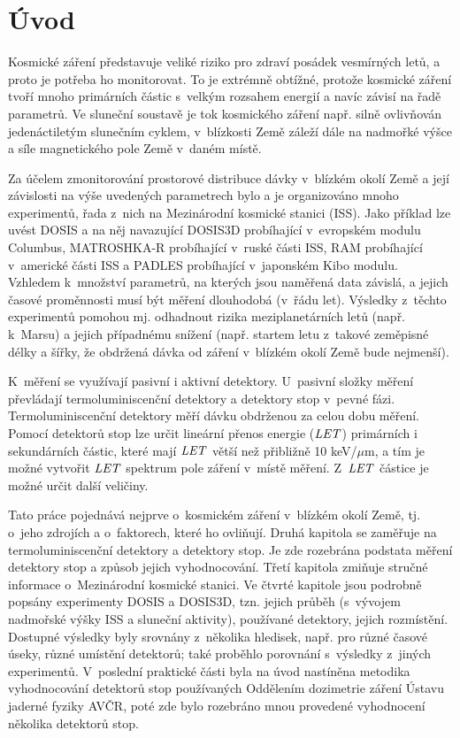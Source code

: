\chapter*{Úvod}
\markright{}
Kosmické záření představuje veliké riziko pro zdraví posádek vesmírných letů, a proto je potřeba ho monitorovat. To je extrémně obtížné, protože kosmické záření tvoří mnoho primárních částic s~velkým rozsahem energií a navíc závisí na řadě parametrů. Ve sluneční soustavě je tok kosmického záření např. silně ovlivňován jedenáctiletým slunečním cyklem, v~blízkosti Země záleží dále na nadmořké výšce a síle magnetického pole Země v~daném místě. 

Za účelem zmonitorování prostorové distribuce dávky v~blízkém okolí Země a její závislosti na výše uvedených parametrech bylo a je organizováno mnoho experimentů, řada z~nich na Mezinárodní kosmické stanici (ISS). Jako příklad lze uvést DOSIS a na něj navazující DOSIS3D probíhající v~evropském modulu Columbus, MATROSHKA-R probíhající v~ruské části ISS, RAM probíhající v~americké části ISS a PADLES probíhající v~japonském Kibo modulu. Vzhledem k~množství parametrů, na kterých jsou naměřená data závislá, a jejich časové proměnnosti musí být měření dlouhodobá (v~řádu let). Výsledky z~těchto experimentů pomohou mj. odhadnout rizika meziplanetárních letů (např. k~Marsu) a jejich případnému snížení (např. startem letu z~takové zeměpisné délky a šířky, že obdržená dávka od záření v~blízkém okolí Země bude nejmenší). 

K~měření se využívají pasivní i aktivní detektory. U~pasivní složky měření převládají termoluminiscenční detektory a detektory stop v~pevné fázi. Termoluminiscenční detektory měří dávku obdrženou za celou dobu měření. Pomocí detektorů stop lze určit lineární přenos energie ($\mathit{LET}$) primárních i sekundárních částic, které mají $\mathit{LET}$ větší než přibližně 10 keV/$\mu$m, a tím je možné vytvořit $\mathit{LET}$ spektrum pole záření v~místě měření. Z~$\mathit{LET}$ částice je možné určit další veličiny.

Tato práce pojednává nejprve o~kosmickém záření v~blízkém okolí Země, tj. o~jeho zdrojích a o~faktorech, které ho ovliňují. Druhá kapitola se zaměřuje na termoluminiscenční detektory a detektory stop. Je zde rozebrána podstata měření detektory stop a způsob jejich vyhodnocování. Třetí kapitola zmiňuje stručné informace o~Mezinárodní kosmické stanici. Ve čtvrté kapitole jsou podrobně popsány experimenty DOSIS a DOSIS3D, tzn. jejich průběh (s~vývojem nadmořské výšky ISS a sluneční aktivity), používané detektory, jejich rozmístění. Dostupné výsledky byly srovnány z~několika hledisek, např. pro různé časové úseky, různé umístění detektorů; také proběhlo porovnání s~výsledky
z~jiných experimentů. V~poslední praktické části byla na úvod nastíněna metodika vyhodnocování detektorů stop používaných Oddělením dozimetrie záření Ústavu jaderné fyziky AVČR, poté zde bylo rozebráno mnou provedené vyhodnocení několika detektorů stop.
